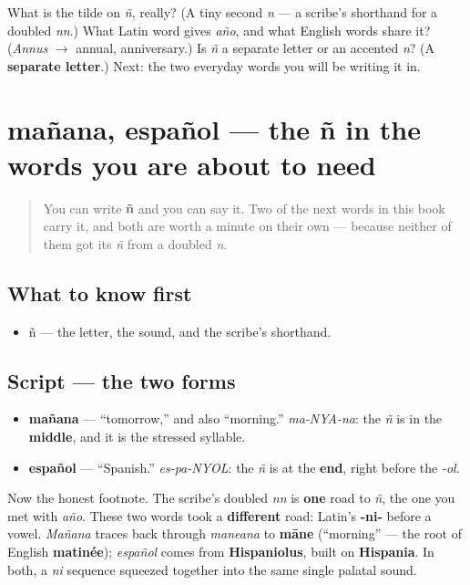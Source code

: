 \begin{tcolorbox}[breakable,colback=teal!4,colframe=teal!35!black,title={Before you move on}]
What is the tilde on \emph{ñ}, really? (A tiny second \emph{n} — a scribe's shorthand for a doubled \emph{nn}.) What Latin word gives \emph{año}, and what English words share it? (\emph{Annus} $\to$ annual, anniversary.) Is \emph{ñ} a separate letter or an accented \emph{n}? (A \textbf{separate letter}.) Next: the two everyday words you will be writing it in.
\end{tcolorbox}
\section[mañana, español]{mañana, español — the ñ in the words you are about to need}

\label{lesson:ES-W02-enye-formas}



\begin{quote}
You can write \textbf{ñ} and you can say it. Two of the next words in this book carry it, and both are worth a minute on their own — because neither of them got its \emph{ñ} from a doubled \emph{n}.
\end{quote}

\subsection*{What to know first}
\begin{itemize}
\raggedright
  \item ñ — the letter, the sound, and the scribe's shorthand.
\end{itemize}

\subsection*{Script — the two forms}
\begin{itemize}
\raggedright
  \item \textbf{mañana} — \textquotedblleft{}tomorrow,\textquotedblright{} and also \textquotedblleft{}morning.\textquotedblright{} \emph{ma-NYA-na}: the \emph{ñ} is in the \textbf{middle}, and it is the stressed syllable.
  \item \textbf{español} — \textquotedblleft{}Spanish.\textquotedblright{} \emph{es-pa-NYOL}: the \emph{ñ} is at the \textbf{end}, right before the \emph{-ol}.
\end{itemize}

Now the honest footnote. The scribe's doubled \emph{nn} is \textbf{one} road to \emph{ñ}, the one you met with \emph{año}. These two words took a \textbf{different} road: Latin's \textbf{-ni-} before a vowel. \emph{Mañana} traces back through \emph{maneana} to \textbf{māne} (\textquotedblleft{}morning\textquotedblright{} — the root of English \textbf{matinée}); \emph{español} comes from \textbf{Hispaniolus}, built on \textbf{Hispania}. In both, a \emph{ni} sequence squeezed together into the same single palatal sound.


